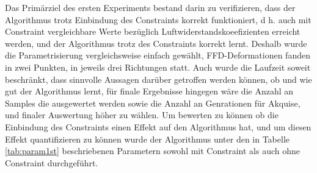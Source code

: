 Das Primärziel des ersten Experiments bestand darin zu verifizieren, dass der Algorithmus trotz Einbindung des Constraints korrekt funktioniert, d h. auch mit Constraint vergleichbare Werte bezüglich Luftwiderstandskoeefizienten erreicht werden, und der Algorithmus trotz des Constraints korrekt lernt.
Deshalb wurde die Parametrisierung vergleichsweise einfach gewählt, FFD-Deformationen fanden in zwei Punkten, in jeweils drei Richtungen statt.
Auch wurde die Laufzeit soweit beschränkt, dass sinnvolle Aussagen darüber getroffen werden können, ob und wie gut der Algorithmus lernt, für finale Ergebnisse hingegen wäre die Anzahl an Samples die ausgewertet werden sowie die Anzahl an Genrationen für Akquise, und finaler Auswertung höher zu wählen.
Um bewerten zu können ob die Einbindung des Constraints einen Effekt auf den Algorithmus hat, und um diesen Effekt quantifizieren zu können wurde der Algorithmus unter den in Tabelle \ref{tab:param1st} beschriebenen Parametern sowohl mit Constraint als auch ohne Constraint durchgeführt. 
